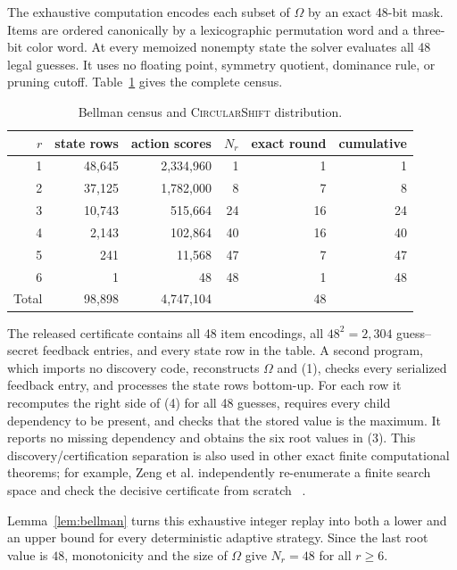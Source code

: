 \documentclass[11pt]{article}
\newcommand{\Om}{\Omega}
\begin{document}
The exhaustive computation encodes each subset of $\Om$ by an exact 48-bit
mask.  Items are ordered canonically by a lexicographic permutation word and a
three-bit color word.  At every memoized nonempty state the solver evaluates
all 48 legal guesses.  It uses no floating point, symmetry quotient, dominance
rule, or pruning cutoff.  Table~\ref{tab:census} gives the complete census.

\begin{table}[ht]
\centering
\caption{Bellman census and \textsc{CircularShift} distribution.}
\label{tab:census}
\begin{tabular}{rrrrrr}
\toprule
$r$ & state rows & action scores & $N_r$ & exact round & cumulative \\
\midrule
1 & 48,645 & 2,334,960 & 1  & 1  & 1  \\
2 & 37,125 & 1,782,000 & 8  & 7  & 8  \\
3 & 10,743 &   515,664 & 24 & 16 & 24 \\
4 &  2,143 &   102,864 & 40 & 16 & 40 \\
5 &    241 &    11,568 & 47 & 7  & 47 \\
6 &      1 &        48 & 48 & 1  & 48 \\
\midrule
Total & 98,898 & 4,747,104 & & 48 & \\
\bottomrule
\end{tabular}
\end{table}

The released certificate contains all 48 item encodings, all $48^2=2,304$
guess--secret feedback entries, and every state row in the table.  A second
program, which imports no discovery code, reconstructs $\Om$ and (1), checks
every serialized feedback entry, and processes the state rows bottom-up.  For
each row it recomputes the right side of (4) for all 48 guesses, requires every
child dependency to be present, and checks that the stored value is the maximum.
It reports no missing dependency and obtains the six root values in (3).
This discovery/certification separation is also used in other exact finite
computational theorems; for example, Zeng et al. independently re-enumerate a
finite search space and check the decisive certificate from scratch
~\cite{ZengEtAl2026FiniteCertificates}.

Lemma~\ref{lem:bellman} turns this exhaustive integer replay into both a lower
and an upper bound for every deterministic adaptive strategy.  Since the last
root value is $48$, monotonicity and the size of $\Om$ give $N_r=48$ for all
$r\ge6$.
\end{document}

